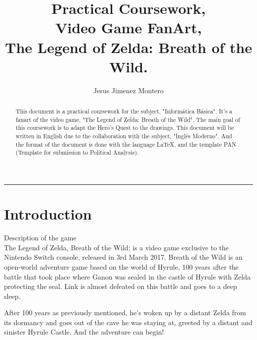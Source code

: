 \documentclass{cup-pan}
\title{Practical Coursework,\\ Video Game FanArt, \\ The Legend of Zelda: Breath of the Wild.}
\author{Jesus Jimenez Montero}
\affil[1] {Informática Básica, VJ1202}
\affil[2] {Expresión Artística, VJ1204}
\affil[3] {Inglés Moderno, VJ1205}
\begin{document}
\maketitle
\textcolor{PANDarkBlue}{\hrule}


\tableofcontents
\newpage
\listoffigures
\newpage

\begin{abstract}
    This document is a practical coursework for the subject, "Informática Básica". It's a fanart of the video game, "The Legend of Zelda: Breath of the Wild". The main goal of this coursework is to adapt the Hero's Quest to the drawings.
    This document will be written in English due to the collaboration with the subject, "Inglés Moderno". 
    And the format of the document is done with the language LaTeX, and the template PAN (Template for submission to Political Analysis).

\end{abstract}


\section{Introduction}

    \textcolor{PANDarkBlue}{\large Description of the game}\\
    
    The Legend of Zelda, Breath of the Wild; is a video game exclusive to the Nintendo Switch console, released in 3rd March 2017. 
    Breath of the Wild is an open-world adventure game based on the world of Hyrule, 100 years after the battle that took place where Ganon was sealed in the castle of Hyrule with Zelda protecting the seal. Link is almost defeated on this battle and goes to a deep sleep.
    
    After 100 years as previously mentioned, he's woken up by a distant Zelda from its dormancy and goes out of the cave he was staying at, greeted by a distant and sinister Hyrule Castle. And the adventure can begin!\\
    
\end{document}
